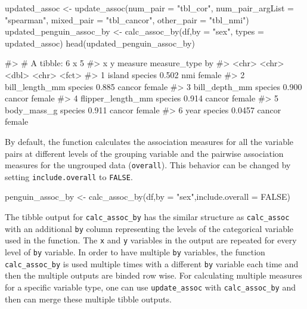 \begin{Schunk}
\begin{Sinput}
updated_assoc <- update_assoc(num_pair = "tbl_cor",
                              num_pair_argList = "spearman",
                              mixed_pair = "tbl_cancor",
                              other_pair = "tbl_nmi")
updated_penguin_assoc_by <- calc_assoc_by(df,by = "sex", types = updated_assoc)
head(updated_penguin_assoc_by)
\end{Sinput}
\begin{Soutput}
#> # A tibble: 6 x 5
#>   x                 y       measure measure_type by    
#>   <chr>             <chr>     <dbl> <chr>        <fct> 
#> 1 island            species  0.502  nmi          female
#> 2 bill_length_mm    species  0.885  cancor       female
#> 3 bill_depth_mm     species  0.900  cancor       female
#> 4 flipper_length_mm species  0.914  cancor       female
#> 5 body_mass_g       species  0.911  cancor       female
#> 6 year              species  0.0457 cancor       female
\end{Soutput}
\end{Schunk}

By default, the function calculates the association measures for all the
variable pairs at different levels of the grouping variable and the
pairwise association measures for the ungrouped data (\texttt{overall}).
This behavior can be changed by setting \texttt{include.overall} to
\texttt{FALSE}.

\begin{Schunk}
\begin{Sinput}
penguin_assoc_by <- calc_assoc_by(df,by = "sex",include.overall = FALSE)
\end{Sinput}
\end{Schunk}

The tibble output for \texttt{calc\_assoc\_by} has the similar structure
as \texttt{calc\_assoc} with an additional \texttt{by} column
representing the levels of the categorical variable used in the
function. The \texttt{x} and \texttt{y} variables in the output are
repeated for every level of \texttt{by} variable. In order to have
multiple \texttt{by} variables, the function \texttt{calc\_assoc\_by} is
used multiple times with a different \texttt{by} variable each time and
then the multiple outputs are binded row wise. For calculating multiple
measures for a specific variable type, one can use
\texttt{update\_assoc} with \texttt{calc\_assoc\_by} and then can merge
these multiple tibble outputs.

